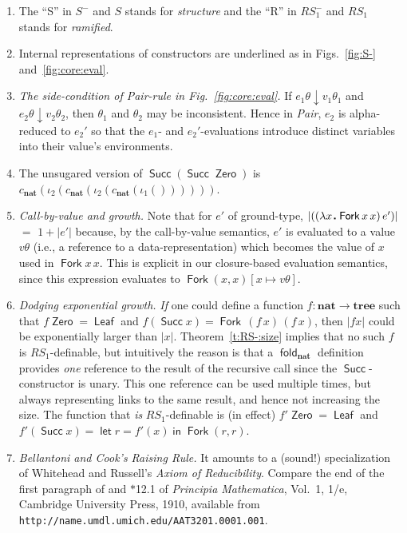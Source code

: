 \documentclass[envcountsame]{llncs}
\newcommand{\key}[1]{\ensuremath{\mathop{\mathsf{#1}}\nolimits}\xspace}
\newcommand{\In}{\key{in}}
\newcommand{\Let}{\key{let}}
\newcommand{\fold}{\key{fold}}
\newcommand{\type}[1]{\ensuremath{\mathbf{#1}}\xspace}
\newcommand{\Nat}{\type{nat}}
\newcommand{\Tree}{\type{tree}}
\newcommand{\constr}[1]{\ensuremath{\mathop{\mathsf{#1}}\nolimits}\xspace}
\newcommand{\Zero}{\constr{Zero}}
\newcommand{\Succ}{\constr{Succ}}
\newcommand{\Leaf}{\constr{Leaf}}
\newcommand{\Fork}{\constr{Fork}}
\newcommand{\asize}[1]{\ensuremath{\mathopen{|}#1\mathclose{|}}\xspace}
\newcommand{\RSi}{\mathit{RS_1}}
\newcommand{\RSmi}{\mathit{RS^-_1}}
\newcommand{\sqdot}{\rule{0.5mm}{0.5mm}}
\newcommand{\lam}[1]{\lambda #1\,\sqdot\,}
\newcommand{\yields}{\mathbin{\downarrow}}
\newcommand{\of}{\colon}
\renewcommand{\colon}{\mathpunct{:}}
\begin{document}
\begin{enumerate}
 \item 
    The ``S'' in $S^-$ and $S$ stands for \emph{structure} and 
    the ``R'' in $\RSmi$ and $\RSi$ stands for \emph{ramified}.
 \item 
    Internal 
    representations of constructors are {underlined}
    as in Figs.~\ref{fig:S-} and~\ref{fig:core:eval}.
 \item 
   \emph{The side-condition of \emph{Pair}-rule in 
   Fig.~\ref{fig:core:eval}.}
   If $e_1\theta\yields v_1\theta_1$ and 
   $e_2\theta\yields v_2\theta_2$, then $\theta_1$ and $\theta_2$ 
   may  be inconsistent. Hence in \emph{Pair}, $e_2$ is alpha-reduced
   to $e_2'$ so that the $e_1$- and $e_2'$-evaluations introduce 
   distinct
   variables into their value's environments.
\item 
    The unsugared version of $\Succ (\Succ \Zero)$ is
	$c_\Nat (\iota_2 (c_\Nat (\iota_2 (c_\Nat (\iota_1 ())))))$.


 \item 
   \emph{Call-by-value and growth.}
Note that for $e'$ of ground-type,    
   $\asize{((\lam{x}\Fork x\,x)\,e')}$ $=$ $1+\asize{e'}$
   because, by the call-by-value semantics, $e'$ is evaluated to a 
   value $v\theta$ (i.e., a reference to a data-representation) which 
   becomes the value of $x$ used in $\Fork x\,x$. This is explicit in 
   our closure-based evaluation semantics, since this expression 
   evaluates to $\Fork(x, x)[x\mapsto v\theta]$.
 \item  
   \emph{Dodging exponential growth.}
   \emph{If} one could define a function $f\of\Nat\to\Tree$ such that
   $f \Zero = \Leaf$ and $f (\Succ x) = \Fork\, (f\,x)\, (f\,x)$, then
   $\asize{f x}$ could be exponentially larger than $\asize{x}$. 
   Theorem~\ref{t:RS-:size} implies that no such $f$ is $\RSi$-definable, but intuitively the reason is  that 
a $\fold_\Nat$ definition provides \emph{one} reference to the
   result of the recursive call since the $\Succ$-constructor is
   unary.  This one reference can be used multiple times, but always
   representing links to the same result, and hence not increasing the
   size.  The function that \emph{is} $\RSi$-definable is (in effect)
   $f'\Zero = \Leaf$ and $f'(\Succ x) = \Let r = f'(x) \In \Fork(r,r)$.   
   
 \item 
    \emph{Bellantoni and Cook's Raising Rule.}  It amounts to a (sound!) 
    specialization of  Whitehead and Russell's \emph{Axiom of 
    Reducibility}.  Compare the end of the first paragraph of 
    \cite[\S5]{BellantoniCook} and $\ast$12.1 of 
    \emph{Principia Mathematica}, Vol.~1, 1/e, Cambridge University Press, 
    1910,  available from 
    \texttt{http://name.umdl.umich.\allowbreak{}edu/AAT3201.0001.001}.


\end{enumerate}
\end{document}
